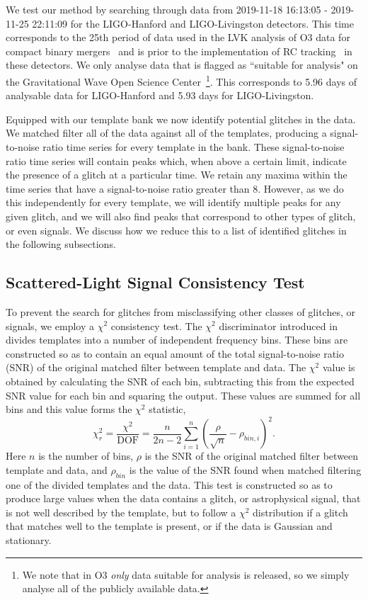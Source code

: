 We test our method by searching through \gw{} data from 2019-11-18 16:13:05 - 2019-11-25 22:11:09 for the LIGO-Hanford and LIGO-Livingston detectors. This time corresponds to the 25th period of data used in the LVK analysis of O3 data for compact binary mergers~\cite{gwtc3:2023} and is prior to the implementation of RC tracking~\cite{reducing_scattering:2020} in these detectors. We only analyse data that is flagged as ``suitable for analysis" on the Gravitational Wave Open Science Center~\cite{GWOSC:2021}\footnote{We note that in O3 \emph{only} data suitable for analysis is released, so we simply analyse all of the publicly available data.}. This corresponds to 5.96 days of analysable data for LIGO-Hanford and 5.93 days for LIGO-Livingston.

Equipped with our template bank we now identify potential \scl{} glitches in the data. We matched filter all of the data against all of the templates, producing a signal-to-noise ratio time series for every template in the bank. These signal-to-noise ratio time series will contain peaks which, when above a certain limit, indicate the presence of a \scl{} glitch at a particular time. We retain any maxima within the time series that have a signal-to-noise ratio greater than 8. However, as we do this independently for every template, we will identify multiple peaks for any given glitch, and we will also find peaks that correspond to other types of glitch, or even \gw{} signals. We discuss how we reduce this to a list of identified \scl{} glitches in the following subsections.

\subsection{Scattered-Light Signal Consistency Test}

To prevent the search for \scl{} glitches from misclassifying other classes of glitches, or \gw{} signals, we employ a $\chi^2$ consistency test. The $\chi^2$ discriminator introduced in \cite{Allen_Chi:2005} divides \gw{} templates into a number of independent frequency bins. These bins are constructed so as to contain an equal amount of the total signal-to-noise ratio (SNR) of the original matched filter between template and data. The $\chi^{2}$ value is obtained by calculating the SNR of each bin, subtracting this from the expected SNR value for each bin and squaring the output. These values are summed for all bins and this value forms the $\chi^{2}$ statistic,
%
\begin{equation}
  \chi_{r}^{2} = \frac{\chi^{2}}{\textrm{DOF}} = \frac{n}{2n - 2} \sum_{i=1}^n \left(\frac{\rho}{\sqrt{n}} - \rho_{bin,i}\right)^2.
  \label{4:eqn:chi_squared}
\end{equation}
%
Here $n$ is the number of bins, $\rho$ is the SNR of the original matched filter between template and data, and $\rho_{bin}$ is the value of the SNR found when matched filtering one of the divided templates and the data. This test is constructed so as to produce large values when the data contains a glitch, or astrophysical signal, that is not well described by the template, but to follow a $\chi^2$ distribution if a glitch that matches well to the template is present, or if the data is Gaussian and stationary.

